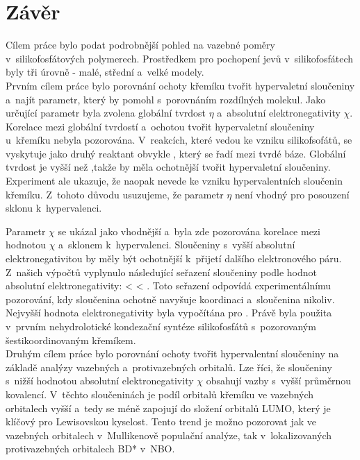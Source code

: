 \documentclass[
digital, %
table,   %
lof,     %
lot,     %
oneside,
]{fithesis3}
\begin{document}
\chapter{Závěr}
Cílem práce bylo podat podrobnější pohled na vazebné poměry v~silikofosfátových polymerech. Prostředkem pro pochopení jevů v~silikofosfátech byly tři úrovně - malé, střední a~velké modely. \\

Prvním cílem práce bylo porovnání ochoty křemíku tvořit hypervaletní sloučeniny a~najít parametr, který by pomohl s~porovnáním rozdílných molekul. Jako určující parametr byla zvolena globální tvrdost $\eta$ a~absolutní elektronegativity $\chi$.
Korelace mezi globální tvrdostí a~ochotou tvořit hypervaletní sloučeniny u~křemíku nebyla pozorována. V~reakcích, které vedou ke vzniku silikofsofátů, se vyskytuje jako druhý reaktant obvykle , který se řadí mezi tvrdé báze. Globální tvrdost  je vyšší než ,takže by měla ochotnější tvořit hypervaletní sloučeniny. Experiment ale ukazuje, že  naopak nevede ke vzniku hypervalentních sloučenin křemíku. Z~tohoto důvodu usuzujeme, že parametr $\eta$ není vhodný pro posouzení sklonu k~hypervalenci.

Parametr $\chi$ se ukázal jako vhodnější a~byla zde pozorována korelace mezi hodnotou $\chi$ a~sklonem k~hypervalenci. Sloučeniny s~vyšší absolutní elektronegativitou by měly být ochotnější k~přijetí dalšího elektronového páru. Z~našich výpočtů vyplynulo následující seřazení sloučeniny podle hodnot absolutní elektronegativity:  <  < . Toto seřazení odpovídá experimentálnímu pozorování, kdy sloučenina  ochotně navyšuje koordinaci a~sloučenina  nikoliv. Nejvyšší hodnota elektronegativity byla vypočítána pro . Právě  byla použita v~prvním nehydrolotické kondezační syntéze silikofosfátů s~pozorovaným šestikoordinovaným křemíkem.\\

Druhým cílem práce bylo porovnání ochoty tvořit hypervalentní sloučeniny na základě analýzy vazebných a~protivazebných orbitalů. Lze říci, že sloučeniny s~nižší hodnotou absolutní elektronegativity $\chi$ obsahují vazby s~vyšší průměrnou kovalencí. V~těchto sloučeninách je podíl orbitalů křemíku ve vazebných orbitalech vyšší a~tedy se méně zapojují do složení orbitalů LUMO, který je klíčový pro Lewisovskou kyselost. Tento trend je možno pozorovat jak ve vazebných orbitalech v~Mullikenově populační analýze, tak v~lokalizovaných protivazebných orbitalech BD* v~NBO.\\
\end{document}
